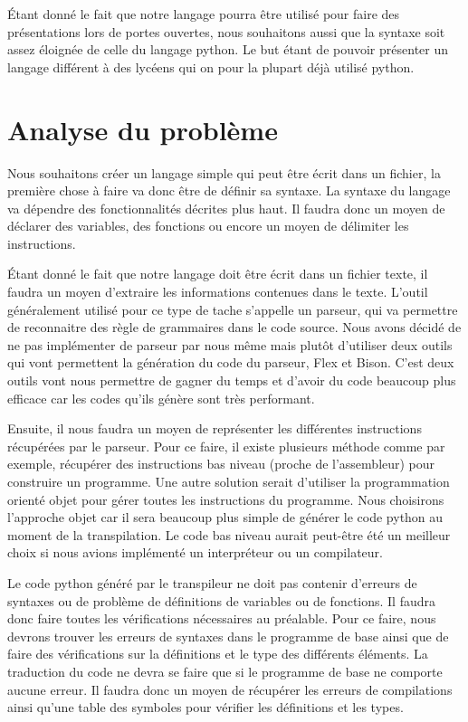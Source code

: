 \documentclass[a4paper]{article}%
\begin{document}
Étant donné le fait que notre langage pourra être utilisé pour faire des
présentations lors de portes ouvertes, nous souhaitons aussi que la syntaxe soit
assez éloignée de celle du langage python. Le but étant de pouvoir présenter
un langage différent à des lycéens qui on pour la plupart déjà utilisé python.

\section{Analyse du problème}

Nous souhaitons créer un langage simple qui peut être écrit dans un fichier, la
première chose à faire va donc être de définir sa syntaxe. La syntaxe du langage
va dépendre des fonctionnalités décrites plus haut. Il faudra donc un moyen de
déclarer des variables, des fonctions ou encore un moyen de délimiter les
instructions.

Étant donné le fait que notre langage doit être écrit dans un fichier texte, il
faudra un moyen d'extraire les informations contenues dans le texte. L'outil
généralement utilisé pour ce type de tache s'appelle un parseur, qui va
permettre de reconnaitre des règle de grammaires dans le code source. Nous avons
décidé de ne pas implémenter de parseur par nous même mais plutôt d'utiliser
deux outils qui vont permettent la génération du code du parseur, Flex et Bison.
C'est deux outils vont nous permettre de gagner du temps et d'avoir du code
beaucoup plus efficace car les codes qu'ils génère sont très performant.

Ensuite, il nous faudra un moyen de représenter les différentes instructions
récupérées par le parseur. Pour ce faire, il existe plusieurs méthode comme par
exemple, récupérer des instructions bas niveau (proche de l'assembleur) pour
construire un programme. Une autre solution serait d'utiliser la programmation
orienté objet pour gérer toutes les instructions du programme. Nous choisirons
l'approche objet car il sera beaucoup plus simple de générer le code python au
moment de la transpilation. Le code bas niveau aurait peut-être été un meilleur
choix si nous avions implémenté un interpréteur ou un compilateur.

Le code python généré par le transpileur ne doit pas contenir d'erreurs de
syntaxes ou de problème de définitions de variables ou de fonctions. Il faudra
donc faire toutes les vérifications nécessaires au préalable. Pour ce faire,
nous devrons trouver les erreurs de syntaxes dans le programme de base ainsi que
de faire des vérifications sur la définitions et le type des différents
éléments. La traduction du code ne devra se faire que si le programme de base ne
comporte aucune erreur. Il faudra donc un moyen de récupérer les erreurs de
compilations ainsi qu'une table des symboles pour vérifier les définitions et
les types.
\end{document}
